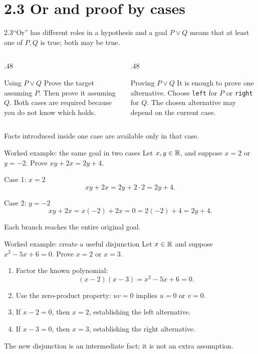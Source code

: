 \section{2.3 Or and proof by cases}
\begin{frame}{2.3\quad ``Or'' has different roles in a hypothesis and a goal}
$P\lor Q$ means that at least one of $P,Q$ is true; both may be true.
\begin{columns}[T]
\begin{column}{.48\textwidth}
\begin{block}{Using $P\lor Q$}
Prove the target assuming $P$.
Then prove it assuming $Q$.
Both cases are required because you do not know which holds.
\end{block}
\end{column}
\begin{column}{.48\textwidth}
\begin{block}{Proving $P\lor Q$}
It is enough to prove one alternative.
Choose \texttt{left} for $P$ or \texttt{right} for $Q$.
The chosen alternative may depend on the current case.
\end{block}
\end{column}
\end{columns}
\medskip
Facts introduced inside one case are available only in that case.
\end{frame}

\begin{frame}{Worked example: the same goal in two cases}
Let $x,y\in\mathbb{R}$, and suppose $x=2$ or $y=-2$.
Prove $xy+2x=2y+4$.
\begin{block}{Case 1: $x=2$}
\[
xy+2x=2y+2\cdot2=2y+4.
\]
\end{block}
\begin{block}{Case 2: $y=-2$}
\[
xy+2x=x(-2)+2x=0=2(-2)+4=2y+4.
\]
\end{block}
Each branch reaches the entire original goal.
\end{frame}

\begin{frame}{Worked example: create a useful disjunction}
Let $x\in\mathbb{R}$ and suppose $x^2-5x+6=0$. Prove $x=2$ or $x=3$.
\begin{enumerate}
\item Factor the known polynomial:
\[
(x-2)(x-3)=x^2-5x+6=0.
\]
\item Use the zero-product property: $uv=0$ implies $u=0$ or $v=0$.
\item If $x-2=0$, then $x=2$, establishing the left alternative.
\item If $x-3=0$, then $x=3$, establishing the right alternative.
\end{enumerate}
The new disjunction is an intermediate fact; it is not an extra assumption.
\end{frame}

